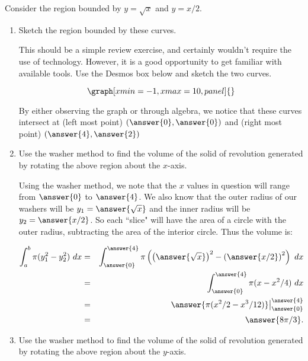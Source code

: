 \documentclass{ximera}
\begin{document}
\begin{question}
Consider the region bounded by $y=\sqrt{x}$ and $y=x/2$.
\begin{enumerate}
\item Sketch the region bounded by these curves.
\begin{explanation}
This should be a simple review exercise, and certainly wouldn't require the use of technology.  However, it is a good opportunity to get familiar with available tools.  Use the Desmos box below and sketch the two curves.

\begin{onlineOnly}
$$\graph[xmin=-1,xmax=10, panel]{}$$
\end{onlineOnly}

By either observing the graph or through algebra, we notice that these curves intersect at (left most point) $(\answer{0}, \answer{0})$ and (right most point) $(\answer{4}, \answer{2})$

\end{explanation}

\item Use the washer method to find the volume of the solid of revolution generated by rotating the above region about the $x$-axis.

\begin{explanation}
Using the washer method, we note that the $x$ values in question will range from $\answer{0}$ to $\answer{4}$.  We also know that the outer radius of our washers will be $y_1=\answer{\sqrt{x}}$ and the inner radius will be $y_2=\answer{x/2}$.  So each ``slice" will have the area of a circle with the outer radius, subtracting the area of the interior circle.  Thus the volume is:

\begin{eqnarray*}
\int_a^b \pi(y_1^2-y_2^2)\ dx&=&\int_{\answer{0}}^{\answer{4}} \pi\left(   \left( \answer{\sqrt{x}}\right)^2  - \left( \answer{x/2}\right)^2   \right)\ dx\\
&=&\int_{\answer{0}}^{\answer{4}} \pi(x-x^2/4)\ dx\\
&=&\answer{\pi(x^2/2-x^3/12)}\big|_{\answer{0}}^{\answer{4}}\\
&=&\answer{8\pi/3}.
\end{eqnarray*}



\end{explanation}

\item Use the washer method to find the volume of the solid of revolution generated by rotating the above region about the $y$-axis.


\end{enumerate}
\end{question}
\end{document}
